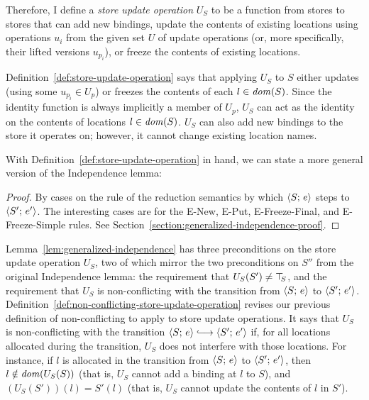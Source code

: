 Therefore, I define a \emph{store update operation} $U_S$ to be a
function from stores to stores that can add new bindings, update the
contents of existing locations using operations $u_i$ from the given
set $U$ of update operations (or, more specifically, their lifted
versions $u_{p_i}$), or freeze the contents of existing locations.

\DefStoreUpdateOperation

Definition~\ref{def:store-update-operation} says that applying $U_S$
to $S$ either updates (using some $u_{p_i} \in U_p$) or freezes the
contents of each $l \in \mathit{dom}(S)$.  Since the identity function is
always implicitly a member of $U_p$, $U_S$ can act as the identity on
the contents of locations $l \in \mathit{dom}(S)$.  $U_S$ can also add new
bindings to the store it operates on; however, it cannot change
existing location names.

With Definition~\ref{def:store-update-operation} in hand, we can state
a more general version of the Independence lemma:

\LemGeneralizedIndependence
\begin{proof}
  By cases on the rule of the reduction semantics by which
  $\langle S;\, e \rangle$ steps to $\langle S';\, e' \rangle$.  The interesting cases
  are for the {\sc E-New}, {\sc E-Put}, {\sc E-Freeze-Final}, and {\sc
    E-Freeze-Simple} rules.  See
  Section~\ref{section:generalized-independence-proof}.
\end{proof}

Lemma~\ref{lem:generalized-independence} has three preconditions on
the store update operation $U_S$, two of which mirror the two
preconditions on $S''$ from the original Independence lemma: the
requirement that $U_S(S') \neq \top\hspace{-0.85mm}_{S}$, and the requirement that $U_S$
is non-conflicting with the transition from $\langle S;\, e \rangle$ to
$\langle S';\, e' \rangle$.
Definition~\ref{def:non-conflicting-store-update-operation} revises
our previous definition of non-conflicting to apply to store update
operations.  It says that $U_S$ is non-conflicting with the transition
$\config{S}{e} \parstepsto \config{S'}{e'}$ if, for all locations
allocated during the transition, $U_S$ does not interfere with those
locations.  For instance, if $l$ is allocated in the transition from
$\langle S;\, e \rangle$ to $\langle S';\, e' \rangle$, then $l \notin \mathit{dom}(U_S(S))$
(that is, $U_S$ cannot add a binding at $l$ to $S$), and $(U_S(S'))(l)
= S'(l)$ (that is, $U_S$ cannot update the contents of $l$ in $S'$).

\DefNonConflictingStoreUpdateOperation

